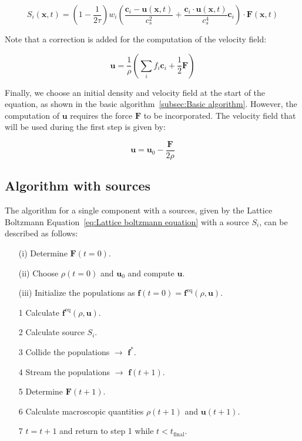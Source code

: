 \begin{equation}\label{eq:Source term}
    S_i(\bm{x}, t) = \left(1 - \frac{1}{2\tau}\right) w_i \left(\frac{\bm{c}_i - \bm{u}(\bm{x}, t)}{c_s^2} + \frac{\bm{c}_i \cdot \bm{u}(\bm{x}, t)}{c_s^4}\bm{c}_i\right) \cdot \bm{F}(\bm{x}, t)
\end{equation}

Note that a correction is added for the computation of the velocity field:

\begin{equation}\label{eq:Velocity with correction}
    \bm{u} = \frac{1}{\rho} \left(\sum_i f_i \bm{c}_i + \frac{1}{2}\bm{F}\right)
\end{equation}

Finally, we choose an initial density and velocity field at the start of the equation, as shown in the basic algorithm~\ref{subsec:Basic algorithm}. However, the computation of $\bm{u}$ requires the force $\bm{F}$ to be incorporated. The velocity field that will be used during the first step is given by:

\begin{equation}
    \bm{u} = \bm{u}_0 - \frac{\bm{F}}{2\rho}
\end{equation}

\subsection{Algorithm with sources}
The algorithm for a single component with a sources, given by the Lattice Boltzmann Equation~\ref{eq:Lattice boltzmann equation} with a source $S_i$, can be described as follows:

\begin{itemize}\label{it:Algorithm with sources}
    \item[(i)] Determine $\bm{F}(t=0)$.
    \item[(ii)] Choose $\rho(t=0)$ and $\bm{u}_0$ and compute $\bm{u}$.
    \item[(iii)] Initialize the populations as $\bm{f}(t=0) = \bm{f}^{\text{eq}}(\rho, \bm{u})$. 
    \item[1] Calculate $\bm{f}^{\text{eq}}(\rho, \bm{u})$.
    \item[2] Calculate source $S_i$.
    \item[3] Collide the populations $\rightarrow$ $\bm{f}^*$.
    \item[4] Stream the populations $\rightarrow$ $\bm{f}(t + 1)$.
    \item[5] Determine $\bm{F}(t + 1)$.
    \item[6] Calculate macroscopic quantities $\rho(t + 1)$ and $\bm{u}(t + 1)$.
    \item[7] $t = t + 1$ and return to step 1 while $t < t_{\text{final}}$.
\end{itemize}

